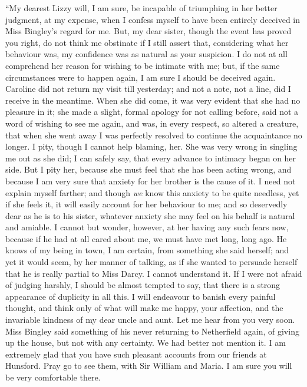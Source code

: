 \documentclass[12pt,openright]{book}
\begin{document}
“My dearest Lizzy will, I am sure, be incapable of triumphing in her better judgment, at my expense, when I confess myself to have been entirely deceived in Miss Bingley’s regard for me. But, my dear sister, though the event has proved you right, do not think me obstinate if I still assert that, considering what her behaviour was, my confidence was as natural as your suspicion. I do not at all comprehend her reason for wishing to be intimate with me; but, if the same circumstances were to happen again, I am sure I should be deceived again. Caroline did not return my visit till yesterday; and not a note, not a line, did I receive in the meantime. When she did come, it was very evident that she had no pleasure in it; she made a slight, formal apology for not calling before, said not a word of wishing to see me again, and was, in every respect, so altered a creature, that when she went away I was perfectly resolved to continue the acquaintance no longer. I pity, though I cannot help blaming, her. She was very wrong in singling me out as she did; I can safely say, that every advance to intimacy began on her side. But I pity her, because she must feel that she has been acting wrong, and because I am very sure that anxiety for her brother is the cause of it. I need not explain myself farther; and though \textit{we} know this anxiety to be quite needless, yet if she feels it, it will easily account for her behaviour to me; and so deservedly dear as he is to his sister, whatever anxiety she may feel on his behalf is natural and amiable. I cannot but wonder, however, at her having any such fears now, because if he had at all cared about me, we must have met long, long ago. He knows of my being in town, I am certain, from something she said herself; and yet it would seem, by her manner of talking, as if she wanted to persuade herself that he is really partial to Miss Darcy. I cannot understand it. If I were not afraid of judging harshly, I should be almost tempted to say, that there is a strong appearance of duplicity in all this. I will endeavour to banish every painful thought, and think only of what will make me happy, your affection, and the invariable kindness of my dear uncle and aunt. Let me hear from you very soon. Miss Bingley said something of his never returning to Netherfield again, of giving up the house, but not with any certainty. We had better not mention it. I am extremely glad that you have such pleasant accounts from our friends at Hunsford. Pray go to see them, with Sir William and Maria. I am sure you will be very comfortable there.
\end{document}
